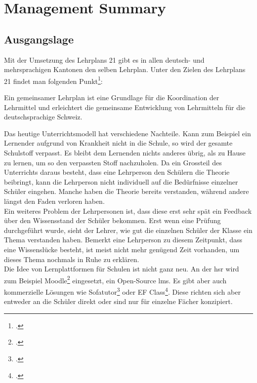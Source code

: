 \section{Management Summary}

\subsection{Ausgangslage}
Mit der Umsetzung des Lehrplans 21 gibt es in allen deutsch- und mehrsprachigen Kantonen den selben Lehrplan. Unter den Zielen des Lehrplans 21 findet man folgenden Punkt\footcite{lp21_ziel}:

\begin{displayquote}
Ein gemeinsamer Lehrplan ist eine Grundlage für die Koordination der Lehrmittel und erleichtert die gemeinsame Entwicklung von Lehrmitteln für die deutschsprachige Schweiz.
\end{displayquote}

Das heutige Unterrichtsmodell hat verschiedene Nachteile. Kann zum Beispiel ein Lernender aufgrund von Krankheit nicht in die Schule, so wird der gesamte Schulstoff verpasst. Es bleibt dem Lernenden nichts anderes übrig, als zu Hause zu lernen, um so den verpassten Stoff nachzuholen. Da ein Grossteil des Unterrichts daraus besteht, dass eine Lehrperson den Schülern die Theorie beibringt, kann die Lehrperson nicht individuell auf die Bedürfnisse einzelner Schüler eingehen. Manche haben die Theorie bereits verstanden, während andere längst den Faden verloren haben. \\

Ein weiteres Problem der Lehrpersonen ist, dass diese erst sehr spät ein Feedback über den Wissensstand der Schüler bekommen. Erst wenn eine Prüfung durchgeführt wurde, sieht der Lehrer, wie gut die einzelnen Schüler der Klasse ein Thema verstanden haben. Bemerkt eine Lehrperson zu diesem Zeitpunkt, dass eine Wissenslücke besteht, ist meist nicht mehr genügend Zeit vorhanden, um dieses Thema nochmals in Ruhe zu erklären. \\


Die Idee von Lernplattformen für Schulen ist nicht ganz neu. An der \gls{hsr} wird zum Beispiel Moodle\footcite{moodle_homepage} eingesetzt, ein Open-Source \gls{lms}. Es gibt aber auch kommerzielle Lösungen wie Sofatutor\footcite{sofatutor_homepage} oder EF Class\footcite{ef_class_homepage}. Diese richten sich aber entweder an die Schüler direkt oder sind nur für einzelne Fächer konzipiert. \\

